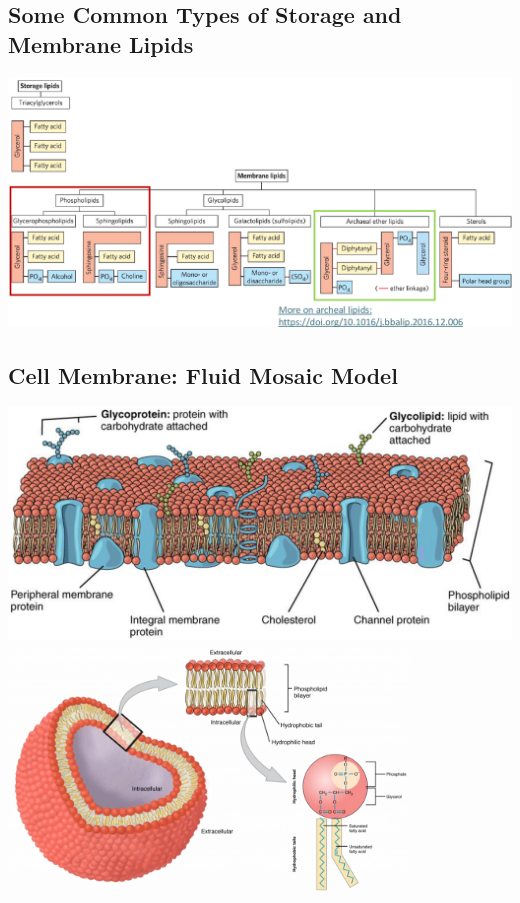 \documentclass[10pt]{article}
\begin{document}
\subsection*{Some Common Types of Storage and Membrane Lipids}
\begin{center}
    \includegraphics*[width=\textwidth]{L3_3.png}
\end{center}

\subsection*{Cell Membrane: Fluid Mosaic Model}
\begin{center}
    \includegraphics*[width=\textwidth]{L3_4.png}\\
    \includegraphics*[width=0.8\textwidth]{L3_5.png}
\end{center}
\end{document}
